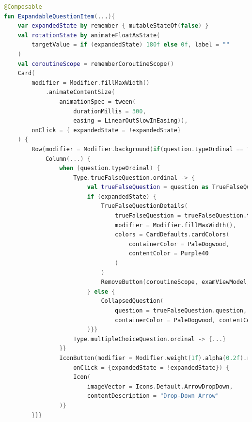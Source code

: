 \begin{lstlisting}[caption={Kinyitható kérdés megvalósítása.}, label={lst:DetailsScreen}, language=Kotlin]
@Composable
fun ExpandableQuestionItem(...){
    var expandedState by remember { mutableStateOf(false) }
    val rotationState by animateFloatAsState(
        targetValue = if (expandedState) 180f else 0f, label = ""
    )
    val coroutineScope = rememberCoroutineScope()
    Card(
        modifier = Modifier.fillMaxWidth()
            .animateContentSize(
                animationSpec = tween(
                    durationMillis = 300,
                    easing = LinearOutSlowInEasing)),
        onClick = { expandedState = !expandedState}
    ) {
        Row(modifier = Modifier.background(if(question.typeOrdinal == Type.trueFalseQuestion.ordinal) PaleDogwood else Green)) {
            Column(...) {
                when (question.typeOrdinal) {
                    Type.trueFalseQuestion.ordinal -> {
                        val trueFalseQuestion = question as TrueFalseQuestionDto
                        if (expandedState) {
                            TrueFalseQuestionDetails(
                                trueFalseQuestion = trueFalseQuestion.toTrueFalseQuestionDetails(...),
                                modifier = Modifier.fillMaxWidth(),
                                colors = CardDefaults.cardColors(
                                    containerColor = PaleDogwood,
                                    contentColor = Purple40
                                )
                            )
                            RemoveButton(coroutineScope, examViewModel, question)
                        } else {
                            CollapsedQuestion(
                                question = trueFalseQuestion.question,
                                containerColor = PaleDogwood, contentColor = Purple40
                        )}}
                    Type.multipleChoiceQuestion.ordinal -> {...}
                }}
                IconButton(modifier = Modifier.weight(1f).alpha(0.2f).rotate(rotationState),
                    onClick = {expandedState = !expandedState}) {
                    Icon(
                        imageVector = Icons.Default.ArrowDropDown,
                        contentDescription = "Drop-Down Arrow"
                )}
        }}}
\end{lstlisting}

